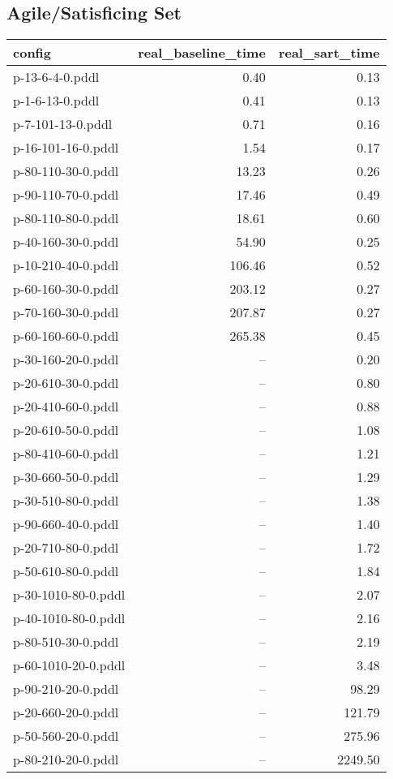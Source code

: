 \documentclass{article}
\begin{document}
                    \subsection*{Agile/Satisficing Set}
                    
                            \begin{center}
                            \scriptsize
                            \begin{tabular}{@{}l|r|r@{}}
                            config & real\_baseline\_time & real\_sart\_time\\\midrule
                             p-13-6-4-0.pddl&0.40&0.13\\
 p-1-6-13-0.pddl&0.41&0.13\\
 p-7-101-13-0.pddl&0.71&0.16\\
 p-16-101-16-0.pddl&1.54&0.17\\
 p-80-110-30-0.pddl&13.23&0.26\\
 p-90-110-70-0.pddl&17.46&0.49\\
 p-80-110-80-0.pddl&18.61&0.60\\
 p-40-160-30-0.pddl&54.90&0.25\\
 p-10-210-40-0.pddl&106.46&0.52\\
 p-60-160-30-0.pddl&203.12&0.27\\
 p-70-160-30-0.pddl&207.87&0.27\\
 p-60-160-60-0.pddl&265.38&0.45\\
 p-30-160-20-0.pddl&--&0.20\\
 p-20-610-30-0.pddl&--&0.80\\
 p-20-410-60-0.pddl&--&0.88\\
 p-20-610-50-0.pddl&--&1.08\\
 p-80-410-60-0.pddl&--&1.21\\
 p-30-660-50-0.pddl&--&1.29\\
 p-30-510-80-0.pddl&--&1.38\\
 p-90-660-40-0.pddl&--&1.40\\
 p-20-710-80-0.pddl&--&1.72\\
 p-50-610-80-0.pddl&--&1.84\\
 p-30-1010-80-0.pddl&--&2.07\\
 p-40-1010-80-0.pddl&--&2.16\\
 p-80-510-30-0.pddl&--&2.19\\
 p-60-1010-20-0.pddl&--&3.48\\
 p-90-210-20-0.pddl&--&98.29\\
 p-20-660-20-0.pddl&--&121.79\\
 p-50-560-20-0.pddl&--&275.96\\
 p-80-210-20-0.pddl&--&2249.50
                            \end{tabular}
                            \end{center}
                    
\end{document}
